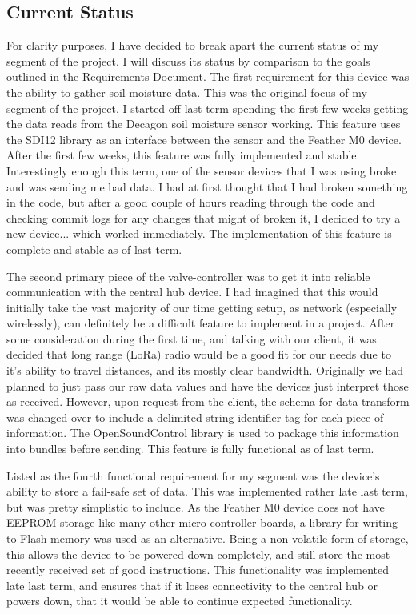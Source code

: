 \documentclass[onecolumn, draftclsnofoot,10pt, compsoc]{IEEEtran}
\begin{document}
\subsection{Current Status}%
For clarity purposes, I have decided to break apart the current status of my segment of the project. I will discuss its status by comparison to the goals outlined in the Requirements Document.
The first requirement for this device was the ability to gather soil-moisture data.
This was the original focus of my segment of the project.
I started off last term spending the first few weeks getting the data reads from the Decagon soil moisture sensor working.
This feature uses the SDI12 library as an interface between the sensor and the Feather M0 device.
After the first few weeks, this feature was fully implemented and stable.
Interestingly enough this term, one of the sensor devices that I was using broke and was sending me bad data.
I had at first thought that I had broken something in the code, but after a good couple of hours reading through the code and checking commit logs for any changes that might of broken it, I decided to try a new device... which worked immediately.
The implementation of this feature is complete and stable as of last term.

The second primary piece of the valve-controller was to get it into reliable communication with the central hub device.
I had imagined that this would initially take the vast majority of our time getting setup, as network (especially wirelessly), can definitely be a difficult feature to implement in a project.
After some consideration during the first time, and talking with our client, it was decided that long range (LoRa) radio would be a good fit for our needs due to it's ability to travel distances, and its mostly clear bandwidth.
Originally we had planned to just pass our raw data values and have the devices just interpret those as received.
However, upon request from the client, the schema for data transform was changed over to include a delimited-string identifier tag for each piece of information.
The OpenSoundControl library is used to package this information into bundles before sending.
This feature is fully functional as of last term.

Listed as the fourth functional requirement for my segment was the device's ability to store a fail-safe set of data.
This was implemented rather late last term, but was pretty simplistic to include.
As the Feather M0 device does not have EEPROM storage like many other micro-controller boards, a library for writing to Flash memory was used as an alternative.
Being a non-volatile form of storage, this allows the device to be powered down completely, and still store the most recently received set of good instructions.
This functionality was implemented late last term, and ensures that if it loses connectivity to the central hub or powers down, that it would be able to continue expected functionality.
\end{document}
